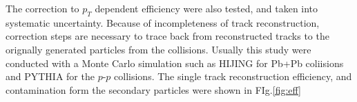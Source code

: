 The correction to $p_T$ dependent efficiency were also tested, and taken into systematic uncertainty. Because of incompleteness of track reconstruction, correction steps are necessary to trace back from reconstructed tracks to the orignally generated particles from the collisions. Usually this study were conducted with a Monte Carlo simulation such as HIJING for Pb+Pb coliisions and PYTHIA for the $p$-$p$ collisions. The single track reconstruction efficiency, and contamination form the secondary particles were shown in FIg.\ref{fig:eff}

		
 	\begin{figure}[!p]
		\begin{center}

\end{center}
\end{figure}
